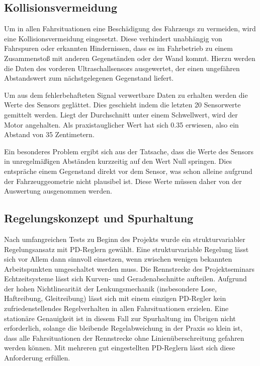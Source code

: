 \subsection{Kollisionsvermeidung}
\label{sec:kollision}

Um in allen Fahrsituationen eine Beschädigung des Fahrzeugs zu vermeiden, wird eine Kollisionsvermeidung eingesetzt. Diese verhindert unabhängig von Fahrspuren oder erkannten Hindernissen, dass es im Fahrbetrieb zu einem Zusammenstoß mit anderen Gegenständen oder der Wand kommt. Hierzu werden die Daten des vorderen Ultraschallsensors ausgewertet, der einen ungefähren Abstandswert zum nächstgelegenen Gegenstand liefert.

Um aus dem fehlerbehafteten Signal verwertbare Daten zu erhalten werden die Werte des Sensors geglättet. Dies geschieht indem die letzten 20 Sensorwerte gemittelt werden. Liegt der Durchschnitt unter einem Schwellwert, wird der Motor angehalten. Als praxistauglicher Wert hat sich 0.35 erwiesen, also ein Abstand von 35 Zentimetern.

Ein besonderes Problem ergibt sich aus der Tatsache, dass die Werte des Sensors in unregelmäßigen Abständen kurzzeitig auf den Wert Null springen. Dies entspräche einem Gegenstand direkt vor dem Sensor, was schon alleine aufgrund der Fahrzeuggeometrie nicht plausibel ist. Diese Werte müssen daher von der Auswertung ausgenommen werden.


\subsection{Regelungskonzept und Spurhaltung}
\label{sec:wallfollower}

Nach umfangreichen Tests zu Beginn des Projekts wurde ein strukturvariabler Regelungsansatz mit PD-Reglern gewählt. Eine strukturvariable Regelung lässt sich vor Allem dann sinnvoll einsetzen, wenn zwischen wenigen bekannten Arbeitspunkten umgeschaltet werden muss. Die Rennstrecke des Projektseminars Echtzeitsysteme lässt sich Kurven- und Geradenabschnitte aufteilen. Aufgrund der hohen Nichtlinearität der Lenkungsmechanik (insbesondere Lose, Haftreibung, Gleitreibung) lässt sich mit einem einzigen PD-Regler kein zufriedenstellendes Regelverhalten in allen Fahrsituationen erzielen. Eine stationäre Genauigkeit ist in diesem Fall zur Spurhaltung im Übrigen nicht erforderlich, solange die bleibende Regelabweichung in der Praxis so klein ist, dass alle Fahrsituationen der Rennstrecke ohne Linienüberschreitung gefahren werden können. Mit mehreren gut eingestellten PD-Reglern lässt sich diese Anforderung erfüllen.

